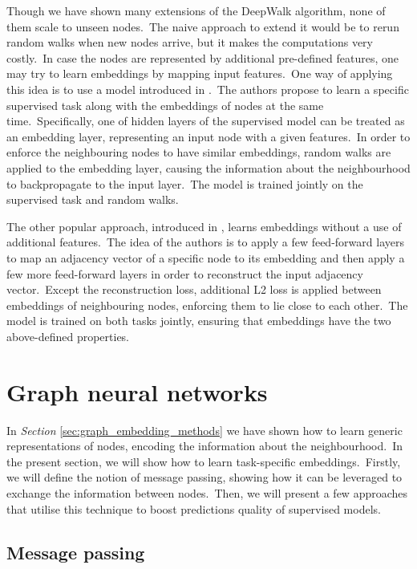 \documentclass[longabstract, english, mgr]{iithesis}
\theoremstyle{default_theorem_style}\newtheorem{theorem}{Theorem}
\theoremstyle{default_theorem_style}\newtheorem{definition}{Definition}
\begin{document}
Though we have shown many extensions of the DeepWalk algorithm, none of them scale to unseen nodes.\ The naive approach
to extend it would be to rerun random walks when new nodes arrive, but it makes the computations very costly.\ In
case the nodes are represented by additional pre-defined features, one may try to learn embeddings by mapping input
features.\ One way of applying this idea is to use a model introduced in \cite{planetoid}.\ The authors propose to
learn a specific supervised task along with the embeddings of nodes at the same time.\ Specifically, one of hidden
layers of the supervised model can be treated as an embedding layer, representing an input node with a given
features.\ In order to enforce the neighbouring nodes to have similar embeddings, random walks are applied to
the embedding layer, causing the information about the neighbourhood to backpropagate to the input layer.\ The model is
trained jointly on the supervised task and random walks.\newline

\noindent The other popular approach, introduced in \cite{sdne}, learns embeddings without a use of additional
features.\ The idea of the authors is to apply a few feed-forward layers to map an adjacency vector of a specific node
to its embedding and then apply a few more feed-forward layers in order to reconstruct the input adjacency
vector.\ Except the reconstruction loss, additional L2 loss is applied between embeddings of neighbouring nodes,
enforcing them to lie close to each other.\ The model is trained on both tasks jointly, ensuring that embeddings have
the two above-defined properties.

\section{Graph neural networks}\label{sec:graph_neural_networks}

In \textit{Section} \ref{sec:graph_embedding_methods} we have shown how to learn generic representations of nodes,
encoding the information about the neighbourhood.\ In the present section, we will show how to learn task-specific
embeddings.\ Firstly, we will define the notion of message passing, showing how it can be leveraged to exchange the
information between nodes.\ Then, we will present a few approaches that utilise this technique to boost
predictions quality of supervised models.

\subsection{Message passing}
\end{document}

